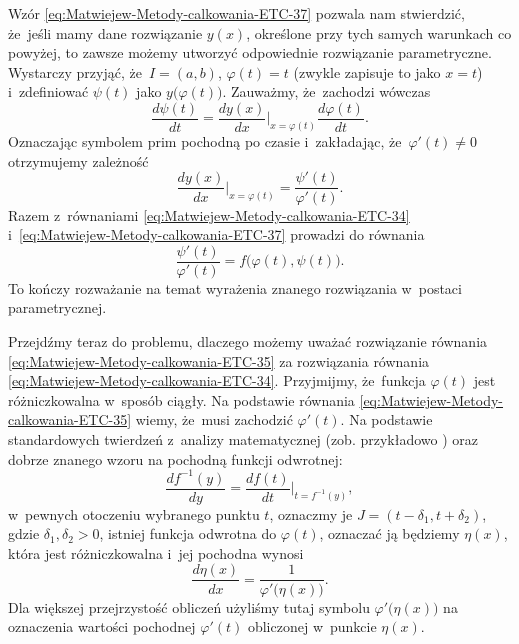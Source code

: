 \documentclass[a4paper,11pt]{article}
\numberwithin{equation}{section}
\begin{document}
Wzór \eqref{eq:Matwiejew-Metody-calkowania-ETC-37}
pozwala nam stwierdzić, że~jeśli mamy dane rozwiązanie $y( x )$, określone
przy tych samych warunkach co powyżej, to zawsze możemy utworzyć odpowiednie
rozwiązanie parametryczne. Wystarczy przyjąć, że~$I = ( a, b )$,
$\varphi( t ) = t$ (zwykle zapisuje to jako $x = t$) i~zdefiniować $\psi( t )$ jako
$y\big( \varphi( t ) \big)$. Zauważmy, że~zachodzi wówczas
\begin{equation}
  \label{eq:Matwiejew-Metody-calkowania-ETC-38}
  \frac{ d \psi( t ) }{ d t } =
  \frac{ d y( x ) }{ d x }\bigg|_{ x = \varphi( t ) }
  \frac{ d \varphi( t ) }{ d t }.
\end{equation}
Oznaczając symbolem prim pochodną po czasie i~zakładając,
że~$\varphi'( t ) \neq 0$ otrzymujemy zależność
\begin{equation}
  \label{eq:Matwiejew-Metody-calkowania-ETC-39}
  \frac{ d y( x ) }{ d x }\bigg|_{ x = \varphi( t ) } =
  \frac{ \psi'( t ) }{ \varphi'( t ) }.
\end{equation}
Razem z~równaniami \eqref{eq:Matwiejew-Metody-calkowania-ETC-34}
i~\eqref{eq:Matwiejew-Metody-calkowania-ETC-37} prowadzi do równania
\begin{equation}
  \label{eq:Matwiejew-Metody-calkowania-ETC-40}
  \frac{ \psi'( t ) }{ \varphi'( t ) } =
  f\big( \varphi( t ), \psi( t ) \big).
\end{equation}
To kończy rozważanie na temat wyrażenia znanego rozwiązania w~postaci
parametrycznej.

Przejdźmy teraz do problemu, dlaczego możemy uważać rozwiązanie równania
\eqref{eq:Matwiejew-Metody-calkowania-ETC-35} za rozwiązania równania
\eqref{eq:Matwiejew-Metody-calkowania-ETC-34}. Przyjmijmy, że~funkcja
$\varphi( t )$ jest różniczkowalna w~sposób ciągły. Na podstawie równania
\eqref{eq:Matwiejew-Metody-calkowania-ETC-35} wiemy, że~musi zachodzić
$\varphi'( t )$. Na podstawie standardowych twierdzeń z~analizy matematycznej
(zob. przykładowo \cite{FichtenholzRachunekRozniczkowyETCVolI2005}) oraz
dobrze znanego wzoru na pochodną funkcji odwrotnej:
\begin{equation}
  \label{eq:Matwiejew-Metody-calkowania-ETC-41}
  \frac{ d f^{ -1 }( y ) }{ d y } =
  \frac{ d f( t ) }{ d t }\bigg|_{ t = f^{ -1 }( y ) },
\end{equation}
w~pewnych otoczeniu wybranego punktu $t$, oznaczmy je
$J = ( t - \delta_{ 1 }, t + \delta_{ 2 } )$, gdzie $\delta_{ 1 }, \delta_{ 2 } > 0$, istniej
funkcja odwrotna do $\varphi( t )$, oznaczać ją będziemy $\eta( x )$, która jest
różniczkowalna i~jej pochodna wynosi
\begin{equation}
  \label{eq:Matwiejew-Metody-calkowania-ETC-42}
  \frac{ d \eta( x ) }{ d x } =
  \frac{ 1 }{ \varphi'\big( \eta( x ) \big) }.
\end{equation}
Dla większej przejrzystość obliczeń użyliśmy tutaj symbolu
$\varphi'\big( \eta( x ) \big)$ na oznaczenia wartości pochodnej $\varphi'( t )$ obliczonej
w~punkcie $\eta( x )$.
\end{document}
